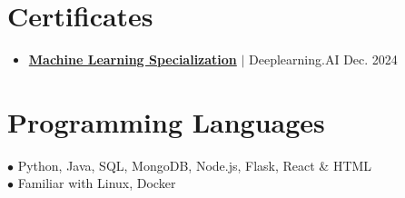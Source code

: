 \documentclass[a4paper,11pt]{article}
\begin{document}
\section{\textbf{Certificates}}
\begin{itemize}[noitemsep] %
    \item \href{https://www.coursera.org/account/accomplishments/specialization/I6Q0LD78C7TV} {\textbf{\color[rgb]{0,0,1} Machine Learning Specialization}} $|$ {Deeplearning.AI}  \hfill {Dec. 2024}
\end{itemize}

\section{\textbf{Programming Languages}}

$\bullet$ Python, Java, SQL, MongoDB, Node.js, Flask, React \& HTML \\
$\bullet$ Familiar with Linux, Docker 
\end{document}
